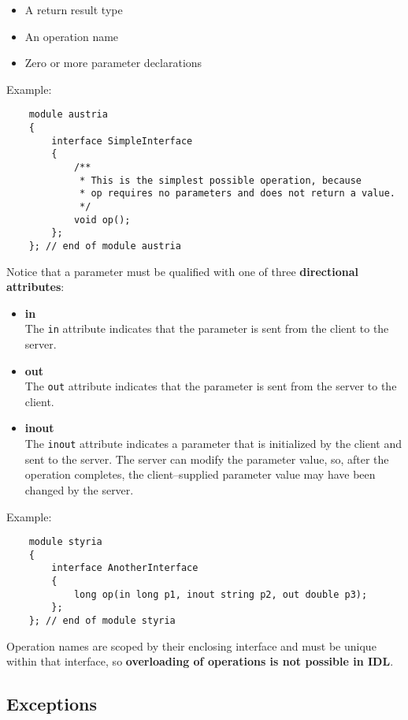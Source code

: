 \begin{itemize}
\item A return result type
\item An operation name
\item Zero or more parameter declarations
\end{itemize}

\vspace{2mm}
Example:
\begin{verbatim}
    module austria
    {
        interface SimpleInterface
        {
            /**
             * This is the simplest possible operation, because
             * op requires no parameters and does not return a value.
             */
            void op(); 
        };
    }; // end of module austria
\end{verbatim}

Notice that a parameter must be qualified with one of three 
{\bf directional attributes}:
\begin{itemize} 
\item {\bf in}\\
	The {\tt in} attribute indicates that the parameter is sent from
	the client to the server.
\item {\bf out}\\
	The {\tt out} attribute indicates that the parameter is sent from 
	the server to the client.
\item {\bf inout}\\
	The {\tt inout} attribute indicates a parameter that is initialized by 
	the client and sent to the server.
	The server can modify the parameter value, so, after the operation
	completes, the client--supplied parameter value may have been changed 
	by the server.
\end{itemize} 

\vspace{2mm}
Example:
\begin{verbatim}
    module styria
    {
        interface AnotherInterface
        {
            long op(in long p1, inout string p2, out double p3);
        };
    }; // end of module styria
\end{verbatim}

Operation names are scoped by their enclosing interface and must be unique
within that interface, so {\bf overloading of operations is not possible in IDL}.



\subsection{Exceptions}

